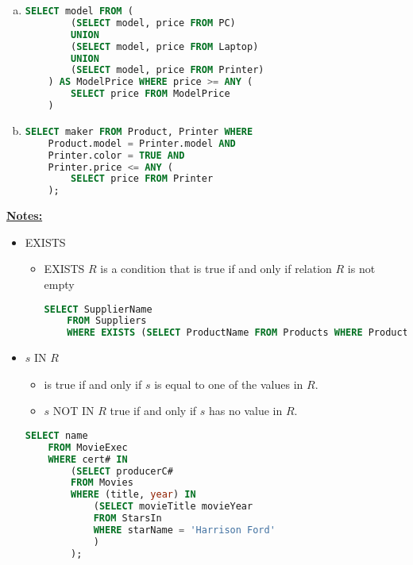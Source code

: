 \documentclass[12pt]{article}
\begin{document}
\begin{enumerate}[1.]
\begin{enumerate}[a)]
        \item

    \begin{lstlisting}[language=SQL]
    SELECT model FROM (
        (SELECT model, price FROM PC)
        UNION
        (SELECT model, price FROM Laptop)
        UNION
        (SELECT model, price FROM Printer)
    ) AS ModelPrice WHERE price >= ANY (
        SELECT price FROM ModelPrice
    )
    \end{lstlisting}

        \item

    \begin{lstlisting}[language=SQL]
    SELECT maker FROM Product, Printer WHERE
    Product.model = Printer.model AND
    Printer.color = TRUE AND
    Printer.price <= ANY (
        SELECT price FROM Printer
    );
    \end{lstlisting}

    \end{enumerate}

    \underline{\textbf{Notes:}}

    \bigskip

    \begin{itemize}
        \item EXISTS
        \begin{itemize}
            \item EXISTS $R$ is a condition that is true if and only if relation $R$ is not empty

            \bigskip

    \begin{lstlisting}[language=SQL]
    SELECT SupplierName
    FROM Suppliers
    WHERE EXISTS (SELECT ProductName FROM Products WHERE Products.SupplierID = Suppliers.supplierID AND Price = 22);
    \end{lstlisting}

        \end{itemize}

        \item $s$ IN $R$
        \begin{itemize}
            \item is true if and only if $s$ is equal to one of the values in $R$.
            \item $s$ NOT IN $R$ true if and only if $s$ has no value in $R$.
        \end{itemize}

    \begin{lstlisting}[language=SQL]
    SELECT name
    FROM MovieExec
    WHERE cert# IN
        (SELECT producerC#
        FROM Movies
        WHERE (title, year) IN
            (SELECT movieTitle movieYear
            FROM StarsIn
            WHERE starName = 'Harrison Ford'
            )
        );
    \end{lstlisting}


\end{itemize}
\end{enumerate}
\end{document}
